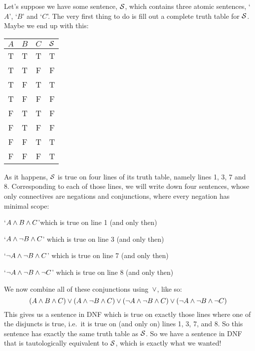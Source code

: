 Let's suppose we have some sentence, $\mathcal{S}$, which contains three atomic sentences, `$A$', `$B$' and `$C$'. The very first thing to do is fill out a complete truth table for $\mathcal{S}$. Maybe we end up with this:
\begin{center}
\begin{tabular}{c c c | c}
$A$ & $B$ & $C$ & $\mathcal{S}$\\
\hline
 T & T & T & T \\
 T & T & F & F \\
 T & F & T & T \\
 T & F & F & F \\
 F & T & T & F \\
 F & T & F & F \\
 F & F & T & T \\
 F & F & F & T
\end{tabular}
\end{center}
%
%
As it happens, $\mathcal{S}$ is true on four lines of its truth table, namely lines 1, 3, 7 and 8. Corresponding to each of those lines, we will write down four sentences, whose only connectives are negations and conjunctions, where every negation has minimal scope:
	\begin{earg}
		\item[\textbullet]  `$A \wedge B \wedge C$'\hfill which is true on line 1 (and only then)
		\item[\textbullet] `$A \wedge \neg B \wedge C$' \hfill which is true on line 3 (and only then)
		\item[\textbullet] `$\neg A \wedge \neg B \wedge C$' \hfill which is true on line 7 (and only then)
		\item[\textbullet] `$\neg A \wedge \neg B \wedge \neg C$' \hfill which is true on line 8 (and only then)
	\end{earg}
We now combine all of these conjunctions using~$\vee$, like so:
$$(A \wedge B \wedge C) \vee (A \wedge \neg B \wedge C) \vee (\neg A \wedge \neg B \wedge C) \vee (\neg A \wedge \neg B \wedge \neg C)$$
This gives us a sentence in DNF which is true on exactly those lines where one of the disjuncts is true, i.e.\ it is true on (and only on) lines 1, 3, 7, and 8. So this sentence has exactly the same truth table as $\mathcal{S}$. So we have a sentence in DNF that is tautologically equivalent to $\mathcal{S}$, which is exactly what we wanted!

